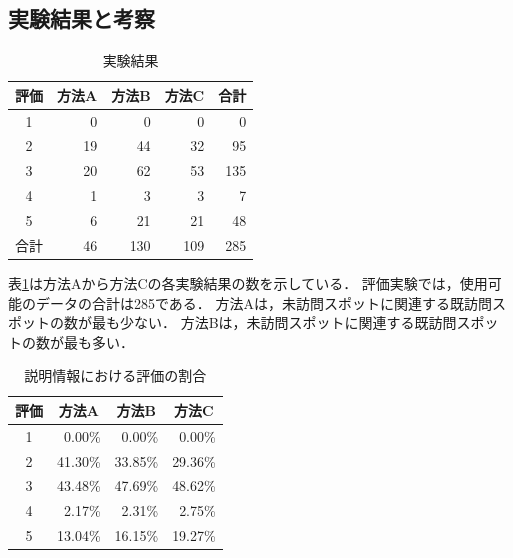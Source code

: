 \documentclass{deimj}
\begin{document}
\subsection{実験結果と考察}
\label{subsec:実験結果}
\begin{table}[t]
  \caption{実験結果}
  \label{table:実験結果}
  \centering
  \begin{tabular}{c|r|r|r|r}
  \hline
  評価 & \multicolumn{1}{c|}{方法A} & \multicolumn{1}{c|}{方法B} & \multicolumn{1}{c|}{方法C} &  \multicolumn{1}{c}{合計} \\ \hline
  1  & 0                      & 0                      & 0                       & 0                      \\
  2  & 19                     & 44                     & 32                     & 95                    \\
  3  & 20                     & 62                     & 53                      & 135                    \\
  4  & 1                      & 3                      & 3                      & 7                     \\
  5  & 6                      & 21                     & 21                     & 48                     \\\hline
  合計 & 46                     & 130                    & 109                    & 285                    \\ \hline
  \end{tabular}
\end{table}

表\ref{table:実験結果}は方法Aから方法Cの各実験結果の数を示している．
評価実験では，使用可能のデータの合計は285である．
方法Aは，未訪問スポットに関連する既訪問スポットの数が最も少ない．
方法Bは，未訪問スポットに関連する既訪問スポットの数が最も多い．

\begin{table}[t]
  \caption{説明情報における評価の割合}
  \label{table:説明情報における評価の割合}
  \centering
  \begin{tabular}{c|r|r|r}
  \hline
  評価 & \multicolumn{1}{c|}{方法A} & \multicolumn{1}{c|}{方法B} & \multicolumn{1}{c}{方法C} \\ \hline
  1  & 0.00\%                     & 0.00\%                     & 0.00\% \\
  2  & 41.30\%                    & 33.85\%                    & 29.36\% \\
  3  & 43.48\%                    & 47.69\%                    & 48.62\% \\
  4  & 2.17\%                     & 2.31\%                     & 2.75\% \\
  5  & 13.04\%                    & 16.15\%                    & 19.27\% \\ \hline
  \end{tabular}
\end{table}
\end{document}
